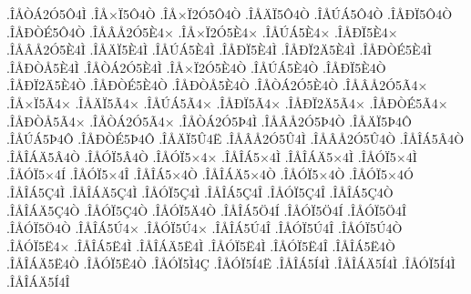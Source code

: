 {.^^ce^^c5^^d2^^c12^^d35^^d44^^cc
.^^ce^^c5^^d7^^cf5^^d44^^d2
.^^ce^^c5^^d7^^cf2^^d35^^d44^^d2
.^^ce^^c5^^c4^^cf5^^d44^^d2
.^^ce^^c5^^da^^c15^^d44^^d2
.^^ce^^c5^^d0^^cf5^^d44^^d2
.^^ce^^c5^^d0^^d2^^c95^^d44^^d2
.^^ce^^c5^^c2^^c52^^d35^^c84^^d7
.^^ce^^c5^^d7^^cf2^^d35^^c84^^d7
.^^ce^^c5^^da^^c15^^c84^^d7
.^^ce^^c5^^d0^^cf5^^c84^^d7
.^^ce^^c5^^c2^^c52^^d35^^c84^^cc
.^^ce^^c5^^c4^^cf5^^c84^^cc
.^^ce^^c5^^da^^c15^^c84^^cc
.^^ce^^c5^^d0^^cf5^^c84^^cc
.^^ce^^c5^^d0^^cf2^^c45^^c84^^cc
.^^ce^^c5^^d0^^d2^^c95^^c84^^cc
.^^ce^^c5^^d0^^d2^^c55^^c84^^cc
.^^ce^^c5^^d2^^c12^^d35^^c84^^cc
.^^ce^^c5^^d7^^cf2^^d35^^c84^^d2
.^^ce^^c5^^da^^c15^^c84^^d2
.^^ce^^c5^^d0^^cf5^^c84^^d2
.^^ce^^c5^^d0^^cf2^^c45^^c84^^d2
.^^ce^^c5^^d0^^d2^^c95^^c84^^d2
.^^ce^^c5^^d0^^d2^^c55^^c84^^d2
.^^ce^^c5^^d2^^c12^^d35^^c84^^d2
.^^ce^^c5^^c2^^c52^^d35^^c34^^d7
.^^ce^^c5^^d7^^cf5^^c34^^d7
.^^ce^^c5^^c4^^cf5^^c34^^d7
.^^ce^^c5^^da^^c15^^c34^^d7
.^^ce^^c5^^d0^^cf5^^c34^^d7
.^^ce^^c5^^d0^^cf2^^c45^^c34^^d7
.^^ce^^c5^^d0^^d2^^c95^^c34^^d7
.^^ce^^c5^^d0^^d2^^c55^^c34^^d7
.^^ce^^c5^^d2^^c12^^d35^^c34^^d7
.^^ce^^c5^^d2^^c12^^d35^^de4^^cc
.^^ce^^c5^^c2^^c52^^d35^^de4^^d2
.^^ce^^c5^^c4^^cf5^^de4^^d4
.^^ce^^c5^^da^^c15^^de4^^d4
.^^ce^^c5^^d0^^d2^^c95^^de4^^d4
.^^ce^^c5^^c4^^cf5^^db4^^cb
.^^ce^^c5^^c2^^c52^^d35^^db4^^cc
.^^ce^^c5^^c2^^c52^^d35^^db4^^d2
.^^ce^^c5^^ce^^c15^^c24^^d2
.^^ce^^c5^^ce^^c1^^c45^^c24^^d2
.^^ce^^c5^^d3^^cf5^^c24^^d2
.^^ce^^c5^^d3^^cf5^^d74^^d7
.^^ce^^c5^^ce^^c15^^d74^^cc
.^^ce^^c5^^ce^^c1^^c45^^d74^^cc
.^^ce^^c5^^d3^^cf5^^d74^^cc
.^^ce^^c5^^d3^^cf5^^d74^^cd
.^^ce^^c5^^d3^^cf5^^d74^^ce
.^^ce^^c5^^ce^^c15^^d74^^d2
.^^ce^^c5^^ce^^c1^^c45^^d74^^d2
.^^ce^^c5^^d3^^cf5^^d74^^d2
.^^ce^^c5^^d3^^cf5^^d74^^d3
.^^ce^^c5^^ce^^c15^^c74^^cc
.^^ce^^c5^^ce^^c1^^c45^^c74^^cc
.^^ce^^c5^^d3^^cf5^^c74^^cc
.^^ce^^c5^^ce^^c15^^c74^^ce
.^^ce^^c5^^d3^^cf5^^c74^^ce
.^^ce^^c5^^ce^^c15^^c74^^d2
.^^ce^^c5^^ce^^c1^^c45^^c74^^d2
.^^ce^^c5^^d3^^cf5^^c74^^d2
.^^ce^^c5^^d3^^cf5^^c44^^d2
.^^ce^^c5^^ce^^c15^^d64^^cd
.^^ce^^c5^^d3^^cf5^^d64^^cd
.^^ce^^c5^^d3^^cf5^^d64^^ce
.^^ce^^c5^^d3^^cf5^^d64^^d2
.^^ce^^c5^^ce^^c15^^da4^^d7
.^^ce^^c5^^d3^^cf5^^da4^^d7
.^^ce^^c5^^ce^^c15^^da4^^ce
.^^ce^^c5^^d3^^cf5^^da4^^ce
.^^ce^^c5^^d3^^cf5^^da4^^d2
.^^ce^^c5^^d3^^cf5^^cb4^^d7
.^^ce^^c5^^ce^^c15^^cb4^^cc
.^^ce^^c5^^ce^^c1^^c45^^cb4^^cc
.^^ce^^c5^^d3^^cf5^^cb4^^cc
.^^ce^^c5^^d3^^cf5^^cb4^^ce
.^^ce^^c5^^ce^^c15^^cb4^^d2
.^^ce^^c5^^ce^^c1^^c45^^cb4^^d2
.^^ce^^c5^^d3^^cf5^^cb4^^d2
.^^ce^^c5^^d3^^cf5^^cc4^^c7
.^^ce^^c5^^d3^^cf5^^cd4^^cb
.^^ce^^c5^^ce^^c15^^cd4^^cc
.^^ce^^c5^^ce^^c1^^c45^^cd4^^cc
.^^ce^^c5^^d3^^cf5^^cd4^^cc
.^^ce^^c5^^ce^^c1^^c45^^cd4^^ce
}
